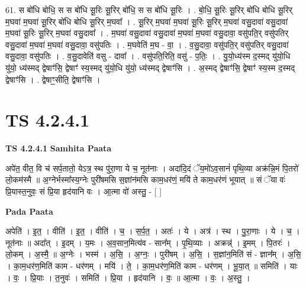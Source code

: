 \documentclass[17pt]{extarticle}
\begin{document}
61. स बो॑धि बोधि॒ स स बो॑धि सू॒रिः सू॒रिर् बो॑धि॒ स स बो॑धि सू॒रिः । . बो॒धि॒ सू॒रिः सू॒रिर् बो॑धि बोधि सू॒रिर् म॒घवा॑ म॒घवा॑ सू॒रिर् बो॑धि बोधि सू॒रिर् म॒घवा᳚ । . सू॒रिर् म॒घवा॑ म॒घवा॑ सू॒रिः सू॒रिर् म॒घवा॑ वसु॒दावा॑ वसु॒दावा॑ म॒घवा॑ सू॒रिः सू॒रिर् म॒घवा॑ वसु॒दावा᳚ । . म॒घवा॑ वसु॒दावा॑ वसु॒दावा॑ म॒घवा॑ म॒घवा॑ वसु॒दावा॒ वसु॑पति॒र् वसु॑पतिर् वसु॒दावा॑ म॒घवा॑ म॒घवा॑ वसु॒दावा॒ वसु॑पतिः । . म॒घवेति॑ म॒घ - वा॒ । . व॒सु॒दावा॒ वसु॑पति॒र् वसु॑पतिर् वसु॒दावा॑ वसु॒दावा॒ वसु॑पतिः । . व॒सु॒दावेति॑ वसु - दावा᳚ । . वसु॑पति॒रिति॒ वसु॑ - प॒तिः॒ । . यु॒यो॒ध्य॑स्म द॒स्मद् यु॑यो॒धि यु॑यो॒ ध्य॑स्मद् द्वेषाꣳ॑सि॒ द्वेषाꣳ॑ स्य॒स्मद् यु॑यो॒धि यु॑यो॒ ध्य॑स्मद् द्वेषाꣳ॑सि । . अ॒स्मद् द्वेषाꣳ॑सि॒ द्वेषाꣳ॑ स्य॒स्म द॒स्मद् द्वेषाꣳ॑सि । . द्वेषाꣳ॒॒सीति॒ द्वेषाꣳ॑सि । \newline
\pagebreak
{}

\section{ TS 4.2.4.1 }

\textbf{TS 4.2.4.1 } \newline
\textbf{Samhita Paata} \newline

अपे॑त॒ वीत॒ वि च॑ सर्प॒तातो॒ येऽत्र॒ स्थ पु॑रा॒णा ये च॒ नूत॑नाः । अदा॑दि॒दं ॅय॒मो॑ऽव॒सानं॑ पृथि॒व्या अक्र॑न्नि॒मं पि॒तरो॑ लो॒कम॑स्मै ॥ अ॒ग्नेर्भस्मा᳚स्य॒ग्नेः पुरी॑षमसि स॒ज्ञांन॑मसि काम॒धर॑णं॒ मयि॑ ते काम॒धर॑णं भूयात् ॥ सं ॅया वः॑ प्रि॒यास्त॒नुवः॒ सं प्रि॒या हृद॑यानि वः । आ॒त्मा वो॑ अस्तु॒ - [  ] \newline

\textbf{Pada Paata} \newline

अपेति॑ । इ॒त॒ । वीति॑ । इ॒त॒ । वीति॑ । च॒ । स॒र्प॒त॒ । अतः॑ । ये । अत्र॑ । स्थ । पु॒रा॒णाः । ये । च॒ । नूत॑नाः ॥ अदा᳚त् । इ॒दम् । य॒मः । अ॒व॒सान॒मित्य॑व - सान᳚म् । पृ॒थि॒व्याः । अक्रन्न्॑ । इ॒मम् । पि॒तरः॑ । लो॒कम् । अ॒स्मै॒ ॥ अ॒ग्नेः । भस्म॑ । अ॒सि॒ । अ॒ग्नः॒ । पुरी॑षम् । अ॒सि॒ । स॒ज्ञांन॒मिति॑ सं - ज्ञान᳚म् । अ॒सि॒ । का॒म॒धर॑ण॒मिति॑ काम - धर॑णम् । मयि॑ । ते॒ । का॒म॒धर॑ण॒मिति॑ काम - धर॑णम् । भू॒या॒त् ॥ समिति॑ । याः । वः॒ । प्रि॒याः । त॒नुवः॑ । समिति॑ । प्रि॒या । हृद॑यानि । वः॒ ॥ आ॒त्मा । वः॒ । अ॒स्तु॒ ।  \newline
\end{document}
